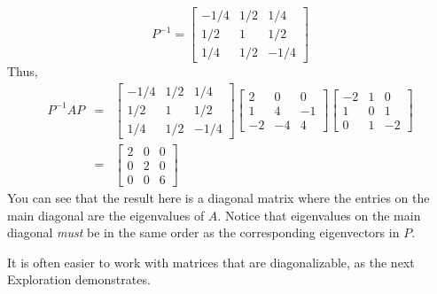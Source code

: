 \documentclass{ximera}
\begin{document}
\begin{example}
\begin{explanation}
  \begin{equation*}
  P^{-1}=\begin{bmatrix}
  -1/4 & 1/2 & 1/4 \\
  1/2 & 1 & 1/2 \\
  1/4 & 1/2 & -1/4
  \end{bmatrix}
  \end{equation*}
  Thus,
  \begin{eqnarray*}
  P^{-1}AP &=&\begin{bmatrix}
  -1/4 & 1/2 & 1/4 \\
  1/2 & 1 & 1/2 \\
  1/4 & 1/2 & -1/4
  \end{bmatrix} \begin{bmatrix}
  2 & 0 & 0 \\
  1 & 4 & -1 \\
  -2 & -4 & 4
  \end{bmatrix} \begin{bmatrix}
  -2 & 1 & 0 \\
  1 & 0 & 1 \\
  0 & 1 & -2
  \end{bmatrix} \\
  &=&\begin{bmatrix}
  2 & 0 & 0 \\
  0 & 2 & 0 \\
  0 & 0 & 6
  \end{bmatrix}
  \end{eqnarray*}
  You can see that the result here is a diagonal matrix where the entries on the main diagonal are the eigenvalues of $A$. Notice that eigenvalues on the main diagonal {\it must} be in the same order as the corresponding eigenvectors in $P$.
  \end{explanation}
  \end{example}
   
  It is often easier to work with matrices that are diagonalizable, as the next Exploration demonstrates. 
   
\end{document}
